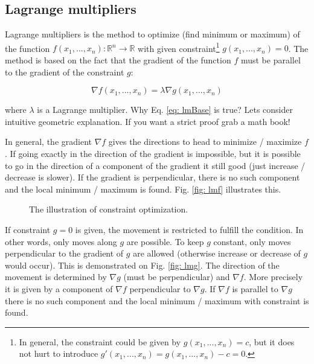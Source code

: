 \subsection{Lagrange multipliers}
\label{sec: lm}

Lagrange multipliers is the method to optimize (find minimum or maximum) of the function $f (x_1, ... , x_n) : \mathbb{R}^n \rightarrow \mathbb{R}$ with given constraint\footnote{In general, the constraint could be given by $g (x_1, ..., x_n) = c$, but it does not hurt to introduce $g'(x_1, ..., x_n) = g (x_1, ..., x_n) - c = 0$.} $g (x_1, ..., x_n) = 0$. The method is based on the fact that the gradient of the function $f$ must be parallel to the gradient of the constraint $g$:

\begin{equation}
 \nabla f (x_1, ..., x_n) = \lambda \nabla g (x_1, ..., x_n)
 \label{eq: lmBase}
\end{equation}

where $\lambda$ is a Lagrange multiplier. Why Eq. \ref{eq: lmBase} is true? Lets consider intuitive geometric explanation. If you want a strict proof grab a math book!

In general, the gradient $\nabla f$ gives the directions to head to minimize / maximize $f$. If going exactly in the direction of the gradient is impossible, but it is possible to go in the direction of a component of the gradient it still good (just increase / decrease is slower). If the gradient is perpendicular, there is no such component and the local minimum / maximum is found. Fig. \ref{fig: lmf} illustrates this.

\begin{figure}
\hfill
{}
\hfill
{}
\hfill
\caption{The illustration of constraint optimization.}
\end{figure}

If constraint $g = 0$ is given, the movement is restricted to fulfill the condition. In other words, only moves along $g$ are possible. To keep $g$ constant, only moves perpendicular to the gradient of $g$ are allowed (otherwise increase or decrease of $g$ would occur). This is demonstrated on Fig. \ref{fig: lmg}. The direction of the movement is determined by $\nabla g$ (must be perpendicular) and $\nabla f$. More precisely it is given by a component of $\nabla f$ perpendicular to $\nabla g$. If $\nabla f$ is parallel to $\nabla g$ there is no such component and the local minimum / maximum with constraint is found.

